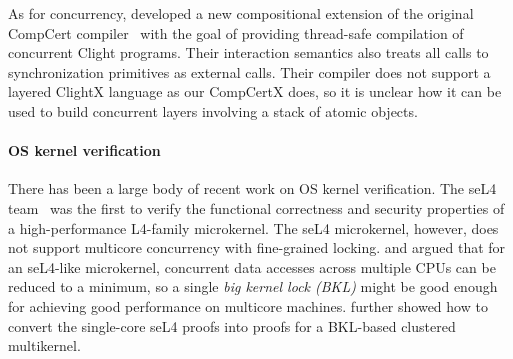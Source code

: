 As for concurrency, \citet{stewart15} developed a new compositional extension of the
original CompCert compiler~\cite{compcert} with the goal of providing
thread-safe compilation of concurrent Clight programs.  Their
interaction semantics also treats all calls to synchronization
primitives as external calls. Their compiler does not support a layered
ClightX language as our CompCertX does, so it is unclear how it can
be used to build concurrent layers involving a stack of atomic objects.

%
% 
%
%
% 
%
%
%
\paragraph{OS kernel verification} There has been a large body
of recent work on OS kernel verification.
The seL4 team~\cite{klein2009sel4,klein14} was the first to verify the
functional correctness and security properties of a high-performance
L4-family microkernel. The seL4 microkernel, however, does not support
multicore concurrency with fine-grained locking.  \citet{peters15}
and \citet{vontessin13} argued that for an seL4-like microkernel,
concurrent data accesses across multiple CPUs can be reduced to a
minimum, so a single {\em big kernel lock (BKL)} might be good enough
for achieving good performance on multicore machines.
\citet{vontessin13} further showed how to convert the single-core seL4
proofs into proofs for a BKL-based clustered multikernel.


